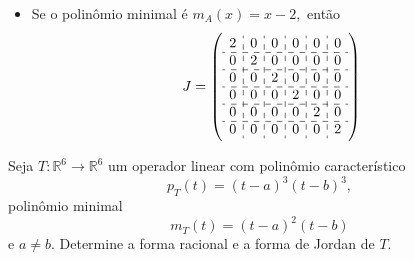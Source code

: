 \documentclass[11pt,a4paper]{article}
\begin{document}
{\begin{itemize}
\begin{itemize}
\item $(x-2)^2, (x-2)^2, (x-2)^2$
\[
\left(\begin{array}{cc:cc:cc}
2&0&0&0&0&0\\
1&2&0&0&0&0\\ \hdashline
0&0&2&0&0&0\\ 
0&0&1&2&0&0\\ \hdashline
0&0&0&0&2&0\\
0&0&0&0&1&2
\end{array}\right)\]
\item $(x-2)^2, (x-2)^2, x-2, x-2$
\[
\left(\begin{array}{cc:cc:c:c}
2&0&0&0&0&0\\
1&2&0&0&0&0\\ \hdashline
0&0&2&0&0&0\\ 
0&0&1&2&0&0\\ \hdashline
0&0&0&0&2&0\\ \hdashline
0&0&0&0&0&2
\end{array}\right)
\]
\item $(x-2)^2, x-2,x-2, x-2, x-2$
\[
\left(\begin{array}{cc:c:c:c:c}
2&0&0&0&0&0\\
1&2&0&0&0&0\\ \hdashline
0&0&2&0&0&0\\ \hdashline
0&0&0&2&0&0\\ \hdashline
0&0&0&0&2&0\\ \hdashline
0&0&0&0&0&2
\end{array}\right)
\]
\end{itemize}
\item Se o polinômio minimal é $m_A(x) = x-2,$ então
\[
J = \left(\begin{array}{c:c:c:c:c:c}
2&0&0&0&0&0\\ \hdashline
0&2&0&0&0&0\\ \hdashline
0&0&2&0&0&0\\ \hdashline
0&0&0&2&0&0\\ \hdashline
0&0&0&0&2&0\\ \hdashline
0&0&0&0&0&2
\end{array}\right)
\]
\end{itemize}
}
\begin{exercicio} Seja $T \colon \mathbb{R}^6 \to \mathbb{R}^6$ um operador linear com polinômio característico 
\[
p_T(t) = (t-a)^3(t-b)^3,
\]
polinômio minimal
\[
m_T(t) = (t-a)^2(t-b)
\]
e $a \neq b.$ Determine a forma racional e a forma de Jordan de $T.$
\end{exercicio}
\end{document}
